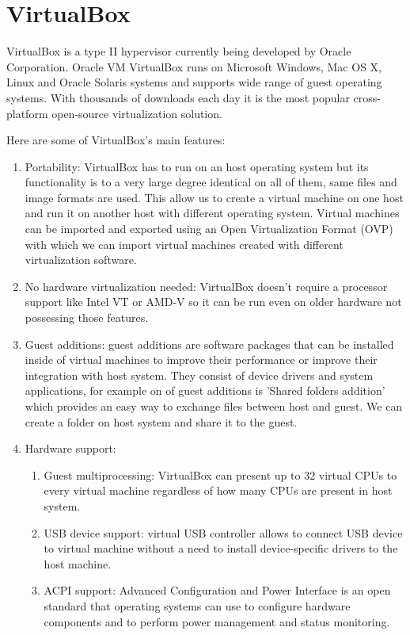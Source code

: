 \section{VirtualBox} \label{virtualbox}
VirtualBox is a type II hypervisor currently being developed by Oracle Corporation. Oracle VM VirtualBox runs on Microsoft Windows, Mac OS X, Linux and Oracle Solaris systems and supports wide range of guest operating systems. With thousands of downloads each day it is the most popular cross-platform open-source virtualization solution.

Here are some of VirtualBox's main features:
\begin{enumerate}
\item Portability: VirtualBox has to run on an host operating system but its functionality is to a very large degree identical on all of them, same files and image formats are used. This allow us to create a virtual machine on one host and run it on another host with different operating system. Virtual machines can be imported and exported using an Open Virtualization Format (OVP) with which we can import virtual machines created with different virtualization software.
\item No hardware virtualization needed: VirtualBox doesn't require a processor support like Intel VT or AMD-V so it can be run even on older hardware not possessing those features.
\item Guest additions: guest additions are software packages that can be installed inside of virtual machines to improve their performance or improve their integration with host system. They consist of device drivers and system applications, for example on of guest additions is 'Shared folders addition' which provides an easy way to exchange files between host and guest. We can create a folder on host system and share it to the guest.
\item Hardware support:
\begin{enumerate}
\item Guest multiprocessing: VirtualBox can present up to 32 virtual CPUs to every virtual machine regardless of how many CPUs are present in host system.
\item USB device support: virtual USB controller allows to connect USB device to virtual machine without a need to install device-specific drivers to the host machine.
\item ACPI support: Advanced Configuration and Power Interface is an open standard that operating systems can use to configure hardware components and to perform power management and status monitoring.

\end{enumerate}
\end{enumerate}
